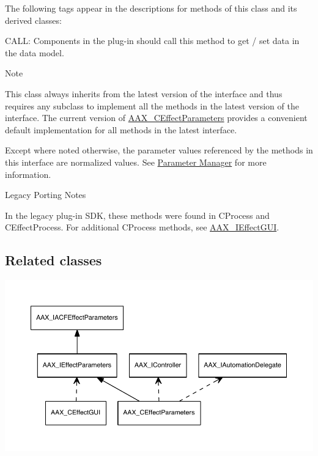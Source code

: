 The following tags appear in the descriptions for methods of this class and its derived classes\+: \begin{DoxyItemize}
\item {\ttfamily C\+A\+L\+L\+:} Components in the plug-\/in should call this method to get / set data in the data model.\end{DoxyItemize}
\begin{DoxyNote}{Note}
\begin{DoxyItemize}
\item This class always inherits from the latest version of the interface and thus requires any subclass to implement all the methods in the latest version of the interface. The current version of \hyperlink{a00018}{A\+A\+X\+\_\+\+C\+Effect\+Parameters} provides a convenient default implementation for all methods in the latest interface. \item Except where noted otherwise, the parameter values referenced by the methods in this interface are normalized values. See \hyperlink{a00344}{Parameter Manager} for more information.\end{DoxyItemize}

\end{DoxyNote}
\begin{DoxyRefDesc}{Legacy Porting Notes}
\item[\hyperlink{a00384__porting_notes000038}{Legacy Porting Notes}]In the legacy plug-\/in S\+D\+K, these methods were found in C\+Process and {\ttfamily C\+Effect\+Process}. For additional {\ttfamily C\+Process} methods, see \hyperlink{a00098}{A\+A\+X\+\_\+\+I\+Effect\+G\+U\+I}.\end{DoxyRefDesc}
\hypertarget{a00099_AAX_IEffectParameters_relclass}{}\subsection{Related classes}\label{a00099_AAX_IEffectParameters_relclass}

\begin{DoxyImage}
\includegraphics[width=\textwidth,height=\textheight/2,keepaspectratio=true]{dot_aax_ieffectparams_related}
\caption{Classes related to A\+A\+X\+\_\+\+I\+Effect\+Parameters by inheritance or composition}
\end{DoxyImage}

